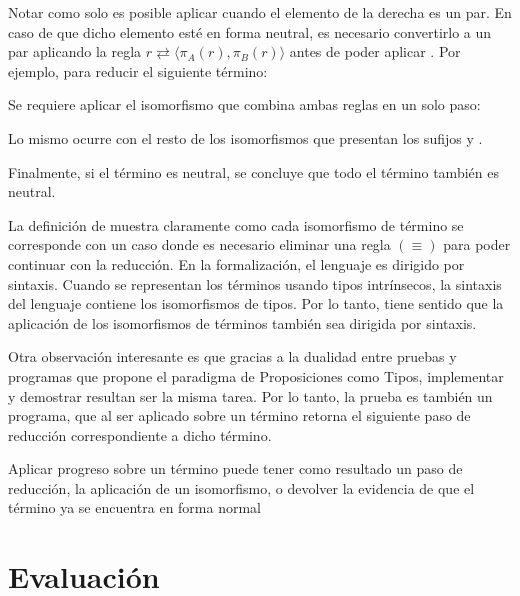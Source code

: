 
Notar como solo es posible aplicar  cuando el elemento de la derecha es un par.
En caso de que dicho elemento esté en forma neutral, es necesario convertirlo a un par aplicando la regla $r \rightleftarrows \langle \pi_A (r), \pi_B(r) \rangle$ antes de poder aplicar .
Por ejemplo, para reducir el siguiente término:


Se requiere aplicar el isomorfismo  que combina ambas reglas en un solo paso:


Lo mismo ocurre con el resto de los isomorfismos que presentan los sufijos  y \const{$\eta$}.

Finalmente, si el término  es neutral, se concluye que todo el término también es neutral.

La definición de  muestra claramente como cada isomorfismo de término se corresponde con un caso donde es necesario eliminar una regla $(\equiv)$ para poder continuar con la reducción.
En la formalización, el lenguaje es dirigido por sintaxis.
Cuando se representan los términos usando tipos intrínsecos, la sintaxis del lenguaje contiene los isomorfismos de tipos.
Por lo tanto, tiene sentido que la aplicación de los isomorfismos de términos también sea dirigida por sintaxis.

Otra observación interesante es que gracias a la dualidad entre pruebas y programas que propone el paradigma de Proposiciones como Tipos, implementar y demostrar resultan ser la misma tarea.
Por lo tanto, la prueba  es también un programa, que al ser aplicado sobre un término retorna el siguiente paso de reducción correspondiente a dicho término.

\begin{example}
	Aplicar progreso sobre un término puede tener como resultado un paso de reducción, la aplicación de un isomorfismo, o devolver la evidencia de que el término ya se encuentra en forma normal
\end{example}

\section{Evaluación}

